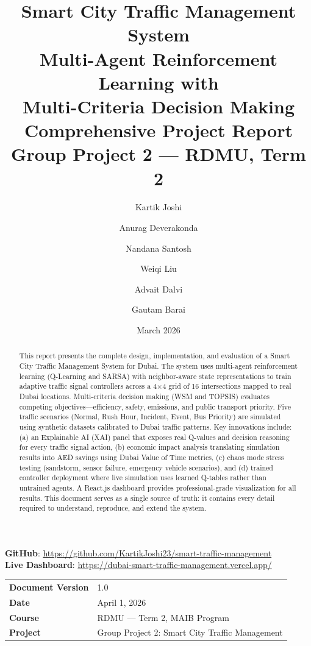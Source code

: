 \documentclass[12pt, a4paper]{article}
\title{
    \vspace{-1cm}
    \textbf{Smart City Traffic Management System} \\[0.4cm]
    \Large Multi-Agent Reinforcement Learning with \\
    Multi-Criteria Decision Making \\[0.5cm]
    \large Comprehensive Project Report \\[0.3cm]
    \normalsize Group Project 2 --- RDMU, Term 2
}
\author{
    Kartik Joshi \and Anurag Deverakonda \and Nandana Santosh \\
    \and Weiqi Liu \and Advait Dalvi \and Gautam Barai
}
\date{March 2026}
\begin{document}
\maketitle
\thispagestyle{fancy}

\vspace{0.2cm}
\begin{center}
\textbf{GitHub}: \url{https://github.com/KartikJoshi23/smart-traffic-management} \\
\textbf{Live Dashboard}: \url{https://dubai-smart-traffic-management.vercel.app/}
\end{center}

\vspace{0.3cm}
\begin{center}
\begin{tabular}{ll}
    \toprule
    \textbf{Document Version} & 1.0 \\
    \textbf{Date} & April 1, 2026 \\
    \textbf{Course} & RDMU --- Term 2, MAIB Program \\
    \textbf{Project} & Group Project 2: Smart City Traffic Management \\
    \bottomrule
\end{tabular}
\end{center}

\begin{abstract}
This report presents the complete design, implementation, and evaluation of a Smart City Traffic Management System for Dubai. The system uses multi-agent reinforcement learning (Q-Learning and SARSA) with neighbor-aware state representations to train adaptive traffic signal controllers across a 4$\times$4 grid of 16 intersections mapped to real Dubai locations. Multi-criteria decision making (WSM and TOPSIS) evaluates competing objectives---efficiency, safety, emissions, and public transport priority. Five traffic scenarios (Normal, Rush Hour, Incident, Event, Bus Priority) are simulated using synthetic datasets calibrated to Dubai traffic patterns. Key innovations include: (a) an Explainable AI (XAI) panel that exposes real Q-values and decision reasoning for every traffic signal action, (b) economic impact analysis translating simulation results into AED savings using Dubai Value of Time metrics, (c) chaos mode stress testing (sandstorm, sensor failure, emergency vehicle scenarios), and (d) trained controller deployment where live simulation uses learned Q-tables rather than untrained agents. A React.js dashboard provides professional-grade visualization for all results. This document serves as a single source of truth: it contains every detail required to understand, reproduce, and extend the system.
\end{abstract}
\end{document}
